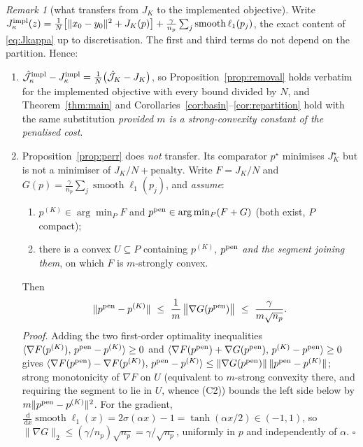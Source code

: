 \documentclass[11pt]{article}
\theoremstyle{remark}\newtheorem{remark}{Remark}
\newcommand{\pstar}{p^\star}
\newcommand{\norm}[1]{\lVert #1\rVert}
\newcommand{\dd}{\,\mathrm{d}}
\newcommand{\hatJ}{\hat{\mathcal J}}
\begin{document}
\begin{remark}[what transfers from $J_K$ to the implemented objective]\label{rem:impl}
Write $J^{\rm impl}_\kappa(z)=\frac1N\big[\norm{x_0-y_0}^2+J_K(p)\big]+\frac{\gamma}{n_p}\sum_j\operatorname{smooth}\ell_1(p_j)$, the exact content of \eqref{eq:Jkappa} up to discretisation. The first and third terms do not depend on the partition. Hence:
\begin{enumerate}[nosep,label=(\roman*)]
\item $\hatJ^{\rm impl}_\kappa-J^{\rm impl}_\kappa=\tfrac1N\big(\hatJ_K-J_K\big)$, so Proposition~\ref{prop:removal} holds verbatim for the implemented objective with every bound divided by $N$, and Theorem~\ref{thm:main} and Corollaries~\ref{cor:basin}--\ref{cor:repartition} hold with the same substitution \emph{provided $m$ is a strong-convexity constant of the penalised cost}.
\item Proposition~\ref{prop:perr} does \emph{not} transfer. Its comparator $\pstar$ minimises $J_K^\star$ but is not a minimiser of $J_K/N+\text{penalty}$. Write $F=J_K/N$ and $G(p)=\frac{\gamma}{n_p}\sum_j\operatorname{smooth}\ell_1(p_j)$, and \emph{assume}:
\begin{enumerate}[nosep,label=(C\arabic*)]
\item $p^{(K)}\in\arg\min_{P}F$ and $p^{\rm pen}\in\arg\min_{P}(F+G)$ (both exist, $P$ compact);
\item there is a convex $U\subseteq P$ containing $p^{(K)}$, $p^{\rm pen}$ \emph{and the segment joining them}, on which $F$ is $m$-strongly convex.
\end{enumerate}
Then
\begin{equation}
\norm{p^{\rm pen}-p^{(K)}}\ \le\ \frac{1}{m}\,\big\lVert\nabla G(p^{\rm pen})\big\rVert
\ \le\ \frac{\gamma}{m\sqrt{n_p}} .
\label{eq:penbias}
\end{equation}
\emph{Proof.} Adding the two first-order optimality inequalities $\langle\nabla F(p^{(K)}),\,p^{\rm pen}-p^{(K)}\rangle\ge0$ and $\langle\nabla F(p^{\rm pen})+\nabla G(p^{\rm pen}),\,p^{(K)}-p^{\rm pen}\rangle\ge0$ gives $\langle\nabla F(p^{\rm pen})-\nabla F(p^{(K)}),\,p^{\rm pen}-p^{(K)}\rangle\le\norm{\nabla G(p^{\rm pen})}\,\norm{p^{\rm pen}-p^{(K)}}$; strong monotonicity of $\nabla F$ on $U$ (equivalent to $m$-strong convexity there, and requiring the segment to lie in $U$, whence (C2)) bounds the left side below by $m\norm{p^{\rm pen}-p^{(K)}}^2$. For the gradient, $\frac{\dd}{\dd x}\operatorname{smooth}\ell_1(x)=2\sigma(\alpha x)-1=\tanh(\alpha x/2)\in(-1,1)$, so $\norm{\nabla G}_2\le(\gamma/n_p)\sqrt{n_p}=\gamma/\sqrt{n_p}$, uniformly in $p$ and independently of $\alpha$. $\square$

\end{enumerate}
\end{remark}
\end{document}
